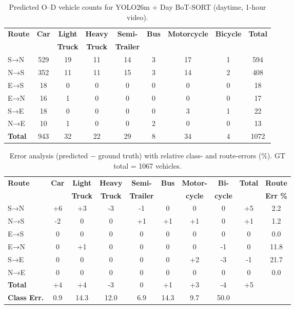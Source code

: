 \begin{table}[H]
\caption{Predicted O–D vehicle counts for YOLO26m + Day BoT-SORT (daytime, 1-hour video).}
\centering
\small
\begin{tabular}{l c c c c c c c c}
\toprule
\textbf{Route} & \textbf{Car} & \textbf{Light} & \textbf{Heavy} & \textbf{Semi-} & \textbf{Bus} & \textbf{Motorcycle} & \textbf{Bicycle} & \textbf{Total} \\
 & & \textbf{Truck} & \textbf{Truck} & \textbf{Trailer} &  & \textbf{} & \textbf{} &  \\
\midrule
S→N & 529 & 19 & 11 & 14 & 3 & 17 & 1 & 594 \\
N→S & 352 & 11 & 11 & 15 & 3 & 14 & 2 & 408 \\
E→S & 18 & 0 & 0 & 0 & 0 & 0 & 0 & 18 \\
E→N & 16 & 1 & 0 & 0 & 0 & 0 & 0 & 17 \\
S→E & 18 & 0 & 0 & 0 & 0 & 3 & 1 & 22 \\
N→E & 10 & 1 & 0 & 0 & 2 & 0 & 0 & 13 \\
\bottomrule
\textbf{Total} & 943 & 32 & 22 & 29 & 8 & 34 & 4 & 1072 \\
\bottomrule
\end{tabular}
\label{tab:best_day_pred}
\end{table}

\begin{table}[H]
\caption{Error analysis (predicted $-$ ground truth) with relative class- and route-errors (\%). GT total = 1067 vehicles.}
\centering
\small
\begin{tabular}{l c c c c c c c c c}
\toprule
\textbf{Route} & \textbf{Car} & \textbf{Light} & \textbf{Heavy} & \textbf{Semi-} & \textbf{Bus} & \textbf{Motor-} & \textbf{Bi-} & \textbf{Total} & \textbf{Route} \\
 & & \textbf{Truck} & \textbf{Truck} & \textbf{Trailer} &  &\textbf{cycle}  &\textbf{cycle}  &  & \textbf{Err \%} \\
\midrule
S→N & +6 & +3 & -3 & -1 & 0 & 0 & 0 & +5 & 2.2 \\
N→S & -2 & 0 & 0 & +1 & +1 & +1 & 0 & +1 & 1.2 \\
E→S & 0 & 0 & 0 & 0 & 0 & 0 & 0 & 0 & 0.0 \\
E→N & 0 & +1 & 0 & 0 & 0 & 0 & -1 & 0 & 11.8 \\
S→E & 0 & 0 & 0 & 0 & 0 & +2 & -3 & -1 & 21.7 \\
N→E & 0 & 0 & 0 & 0 & 0 & 0 & 0 & 0 & 0.0 \\
\midrule
\textbf{Total} & +4 & +4 & -3 & 0 & +1 & +3 & -4 & +5 & \\
\midrule[1.5pt]
\textbf{Class Err.} & 0.9 & 14.3 & 12.0 & 6.9 & 14.3 & 9.7 & 50.0 & & \\
\bottomrule
\end{tabular}
\label{tab:best_day_error_combined}
\end{table}

